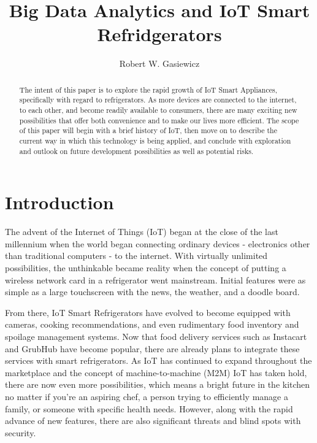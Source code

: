 \documentclass[sigconf]{acmart}
\begin{document}
\title{Big Data Analytics and IoT Smart Refridgerators}


\author{Robert W. Gasiewicz}

\begin{abstract}

The intent of this paper is to explore the rapid growth of IoT Smart Appliances, specifically with regard to refrigerators. As more devices are connected to the internet, to each other, and become readily available to consumers, there are many exciting new possibilities that offer both convenience and to make our lives more efficient. The scope of this paper will begin with a brief history of IoT, then move on to describe the current way in which this technology is being applied, and conclude with exploration and outlook on future development possibilities as well as potential risks. 

\end{abstract}


\maketitle

\section{Introduction}

The advent of the Internet of Things (IoT) began at the close of the last millennium when the world began connecting ordinary devices - electronics other than traditional computers - to the internet. With virtually unlimited possibilities, the unthinkable became reality when the concept of putting a wireless network card in a refrigerator went mainstream. Initial features were as simple as a large touchscreen with the news, the weather, and a doodle board. 
\par
From there, IoT Smart Refrigerators have evolved to become equipped with cameras, cooking recommendations, and even rudimentary food inventory and spoilage management systems. Now that food delivery services such as Instacart and GrubHub have become popular, there are already plans to integrate these services with smart refrigerators. As IoT has continued to expand throughout the marketplace and the concept of machine-to-machine (M2M) IoT has taken hold, there are now even more possibilities, which means a bright future in the kitchen no matter if you're an aspiring chef, a person trying to efficiently manage a family, or someone with specific health needs. However, along with the rapid advance of new features, there are also significant threats and blind spots with security. 
\end{document}

